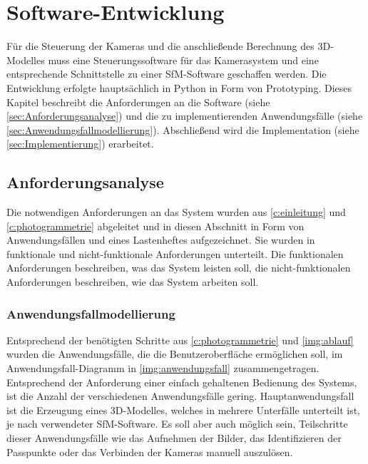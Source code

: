 \documentclass[./00PhotoBox.tex]{subfiles}
\begin{document}
\renewcommand{\itemautorefname}{Anforderung}

\chapter{Software-Entwicklung}
\label{c:software}

Für die Steuerung der Kameras und die anschließende Berechnung des 3D-Modelles muss eine Steuerungssoftware für das Kamerasystem und eine entsprechende Schnittstelle zu einer \Gls{SfM}-Software geschaffen werden. Die Entwicklung erfolgte hauptsächlich in Python in Form von Prototyping. Dieses Kapitel beschreibt die Anforderungen an die Software (siehe \autoref{sec:Anforderungsanalyse}) und die zu implementierenden Anwendungsfälle (siehe \autoref{sec:Anwendungsfallmodellierung}). Abschließend wird die Implementation (siehe \autoref{sec:Implementierung}) erarbeitet.

\section{Anforderungsanalyse}
\label{sec:Anforderungsanalyse}

Die notwendigen Anforderungen an das System wurden aus \autoref{c:einleitung} und \ref{c:photogrammetrie} abgeleitet und in diesen Abschnitt in Form von Anwendungsfällen und eines Lastenheftes aufgezeichnet. Sie wurden in funktionale und nicht-funktionale Anforderungen unterteilt. Die funktionalen Anforderungen beschreiben, was das System leisten soll, die nicht-funktionalen Anforderungen beschreiben, wie das System arbeiten soll. 


\subsection{Anwendungsfallmodellierung}
\label{sec:Anwendungsfallmodellierung}

Entsprechend der benötigten Schritte aus \autoref{c:photogrammetrie} und \autoref{img:ablauf} wurden die Anwendungsfälle, die die Benutzeroberfläche ermöglichen soll, im Anwendungsfall-Dia\-gramm in \autoref{img:anwendungsfall} zusammengetragen. Entsprechend der Anforderung einer einfach gehaltenen Bedienung des Systems, ist die Anzahl der verschiedenen Anwendungsfälle gering. Hauptanwendungsfall ist die Erzeugung eines 3D-Modelles, welches in mehrere Unterfälle unterteilt ist, je nach verwendeter \Gls{SfM}-Software. Es soll aber auch möglich sein, Teilschritte dieser Anwendungsfälle wie das Aufnehmen der Bilder, das Identifizieren der Passpunkte oder das Verbinden der Kameras manuell auszulösen.
\end{document}
